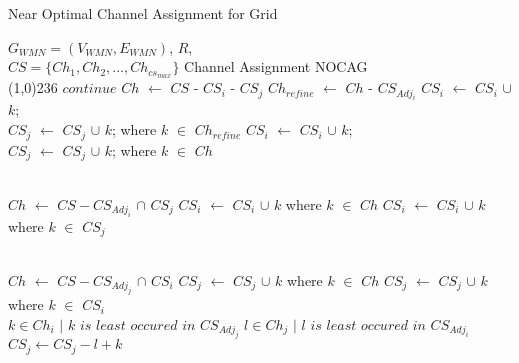 \documentclass[conference]{IEEEtran}
\begin{document}
\renewcommand{\algorithmicrequire}{\textbf{Input:}}
\renewcommand{\algorithmicensure}{\textbf{Output:}}
\begin{algorithm}[htb!] 
\caption{Near Optimal Channel Assignment for Grid}
\label{radcol}
\begin{algorithmic}[1]
{\fontsize{9}{10}
\REQUIRE $G_{WMN} = (V_{WMN},E_{WMN})$, $R$,\\
      \hspace{.35cm}   $CS =\{Ch_{1}, Ch_{2},..., Ch_{cs_{max}}\}$
\ENSURE Channel Assignment NOCAG \\
\line(1,0){236}
\STATE $continue$
 \ENDIF
{}
	\STATE $Ch$  $\leftarrow$ $CS$ - $CS_i$ - $CS_j$ 
	\STATE $Ch_{refine} $ $\leftarrow$ $Ch$ - $CS_{Adj_i}$
	    \STATE $CS_{i}$ $\leftarrow$ $CS_{i}$ $\cup$ $k$;\\ $CS_{j}$ $\leftarrow$ $CS_{j}$ $\cup$ $k$; where $k$ $\in$ $Ch_{refine}$
	\ELSE 
	    \STATE $CS_{i}$ $\leftarrow$ $CS_{i}$ $\cup$ $k$; \\$CS_{j}$ $\leftarrow$ $CS_{j}$ $\cup$ $k$; where $k$ $\in$ $Ch$
	\ENDIF
	
 \ENDIF \\
	\STATE $Ch$ $\leftarrow$ {$CS -  CS_{Adj_i}$} $\cap$ $CS_j$ 
	  \STATE $CS_{i}$ $\leftarrow$ $CS_{i}$ $\cup$ $k$ where $k$ $\in$ $Ch$ 
	\ELSE
	  \STATE $CS_{i}$ $\leftarrow$ $CS_{i}$ $\cup$ $k$ where $k$ $\in$ $CS_{j}$
	\ENDIF
	
	
 \ENDIF\\
	\STATE $Ch$ $\leftarrow$ {$CS -  CS_{Adj_j}$} $\cap$ $CS_i$ 
	  \STATE $CS_{j}$ $\leftarrow$ $CS_{j}$ $\cup$ $k$ where $k$ $\in$ $Ch$ 
	\ELSE
	  \STATE $CS_{j}$ $\leftarrow$ $CS_{j}$ $\cup$ $k$  where  $k$ $\in$ $CS_{i}$
	\ENDIF
 \ENDIF\\
	\STATE $k \in Ch_i$ $|$ $k$ $is$ $least$ $occured$ $in$ $CS_{Adj_j}$
	\STATE $l \in Ch_j$ $|$ $l$ $is$ $least$ $occured$ $in$ $CS_{Adj_i} $
	\STATE $CS_j \leftarrow CS_j - l + k$
 \ENDIF
\ENDFOR
\ENDFOR
}
\end{algorithmic}
\end{algorithm}
\end{document}

